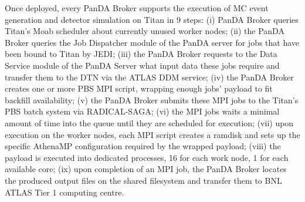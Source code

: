 Once deployed, every PanDA Broker supports the execution of MC event generation
and detector simulation on Titan in 9 steps: (i) PanDA Broker queries Titan's
Moab scheduler about currently unused worker nodes;
(ii) the PanDA Broker queries the Job Dispatcher module of the PanDA server for
jobs that have been bound to Titan by JEDI; (iii)  the PanDA Broker requests to
the Data Service module of the PanDA Server what input data these jobs require
and transfer them to the DTN via the ATLAS DDM service; (iv) the PanDA Broker
creates one or more PBS MPI script, wrapping enough jobs' payload to fit
backfill availability; (v) the PanDA Broker submits these MPI jobs to the
Titan's PBS batch system via RADICAL-SAGA; (vi) the MPI jobs waits a minimal
amount of time into the queue until they are scheduled for execution; (vii) upon
execution on the worker nodes, each MPI script creates a ramdisk and sets up the
specific AthenaMP configuration required by the wrapped payload; (viii) the
payload is executed into dedicated processes, 16 for each work node, 1 for each
available core; (ix) upon completion of an MPI job, the PanDA Broker locates the
produced output files on the shared filesystem and transfer them to BNL ATLAS
Tier 1 computing centre.





